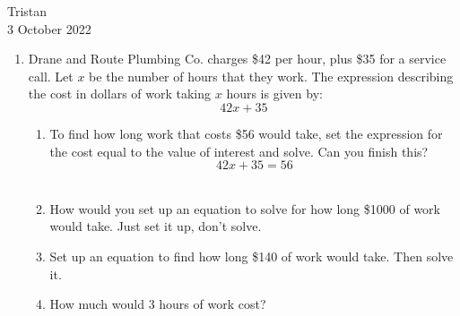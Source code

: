 \documentclass[14pt]{extarticle} %
\begin{document}
\hfill Tristan\\
\null\hfill 3 October 2022

\vspace{10mm}

\begin{enumerate}[itemsep=\fill]
    \item  Drane and Route Plumbing Co. charges \$42 per hour, plus \$35 for a service call. Let $x$ be the number of hours that they work. The expression describing the cost in dollars of work taking $x$ hours is given by:
    \[ 42x+35 \]
    \begin{enumerate}[itemsep=\fill]
        \item To find how long work that costs \$56 would take, set the expression for the cost equal to the value of interest and solve. Can you finish this?
            \[ 42x+35=56 \]\\
        \item How would you set up an equation to solve for how long \$1000 of work would take. Just set it up, don't solve.
\vfill\clearpage
        \item Set up an equation to find how long \$140 of work would take. Then solve it.
        \item How much would 3 hours of work cost?
    \end{enumerate}
\vfill\end{enumerate}
\end{document}
